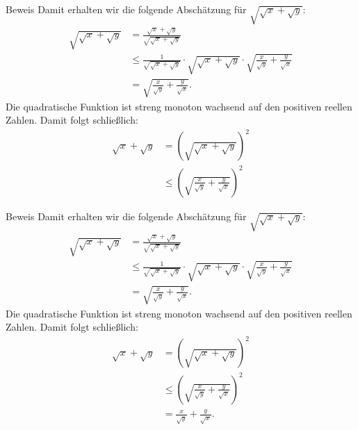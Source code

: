 \documentclass[10pt]{beamer}
\begin{document}
\begin{frame}{Beweis}
    Damit erhalten wir die folgende Abschätzung für \( \sqrt{\sqrt{x} + \sqrt{y}} \):
    \begin{align*}
        \sqrt{\sqrt{x} + \sqrt{y}}
        & = \frac{\sqrt{x} + \sqrt{y}}{\sqrt{\sqrt{x} + \sqrt{y}}} \\
        & \leq \frac{1}{\sqrt{\sqrt{x} + \sqrt{y}}} \cdot \sqrt{\sqrt{x} + \sqrt{y}} \cdot \sqrt{\frac{x}{\sqrt{y}} + \frac{y}{\sqrt{x}}} \\
        & = \sqrt{\frac{x}{\sqrt{y}} + \frac{y}{\sqrt{x}}}.
    \end{align*}
    Die quadratische Funktion ist streng monoton wachsend auf den positiven reellen Zahlen. Damit folgt schließlich:
    \begin{align*}
        \sqrt{x} + \sqrt{y}
        & = \left( \sqrt{\sqrt{x} + \sqrt{y}} \right)^{2} \\
        & \leq \left( \sqrt{\frac{x}{\sqrt{y}} + \frac{y}{\sqrt{x}}} \right)^{2}
    \end{align*}
\end{frame}



\begin{frame}{Beweis}
    Damit erhalten wir die folgende Abschätzung für \( \sqrt{\sqrt{x} + \sqrt{y}} \):
    \begin{align*}
        \sqrt{\sqrt{x} + \sqrt{y}}
        & = \frac{\sqrt{x} + \sqrt{y}}{\sqrt{\sqrt{x} + \sqrt{y}}} \\
        & \leq \frac{1}{\sqrt{\sqrt{x} + \sqrt{y}}} \cdot \sqrt{\sqrt{x} + \sqrt{y}} \cdot \sqrt{\frac{x}{\sqrt{y}} + \frac{y}{\sqrt{x}}} \\
        & = \sqrt{\frac{x}{\sqrt{y}} + \frac{y}{\sqrt{x}}}.
    \end{align*}
    Die quadratische Funktion ist streng monoton wachsend auf den positiven reellen Zahlen. Damit folgt schließlich:
    {\small
    \begin{align*}
        \sqrt{x} + \sqrt{y}
        & = \left( \sqrt{\sqrt{x} + \sqrt{y}} \right)^{2} \\
        & \leq \left( \sqrt{\frac{x}{\sqrt{y}} + \frac{y}{\sqrt{x}}} \right)^{2} \\
        & = \frac{x}{\sqrt{y}} + \frac{y}{\sqrt{x}}.
    \end{align*}
    }
\end{frame}
\end{document}
